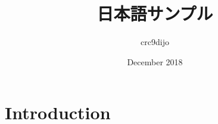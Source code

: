 \documentclass{article}
\title{日本語サンプル}
\author{crc9dijo }
\date{December 2018}
\begin{document}
\maketitle

\section{Introduction}
\end{document}
